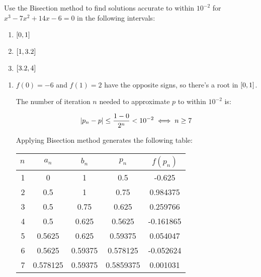 \documentclass[../../../../Assignments.tex]{subfiles}
\begin{document}
\begin{exercise}
    Use the Bisection method to find solutions accurate to within \(10^{-2}\)
    for \(x^3 - 7x^2 + 14x - 6 = 0\) in the following intervals:

    \begin{multicols}{3}
        \begin{enumerate}[label = (\alph*)]
            \item \(\interval{0}{1}\)
            \item \(\interval{1}{\num{3.2}}\)
            \item \(\interval{\num{3.2}}{4}\)
        \end{enumerate}
    \end{multicols}
\end{exercise}

\begin{solution}
    \begin{enumerate}[label = (\alph*)]
        \item \(f(0) = -6\) and \(f(1) = 2\) have the opposite signs, so there's
            a root in \(\interval{0}{1}\).

            The number of iteration \(n\) needed to approximate \(p\) to within
            \(10^{-2}\) is:

            \[\abs{p_n - p} \leq \frac{1 - 0}{2^n} < 10^{-2} \iff n \geq 7\]

            Applying Bisection method generates the following table:

            \begin{table}[H]
                \centering
                \begin{tabular}{r S[table-format=1.6] S[table-format=1.5] S[table-format=1.7] S[table-format=-1.6]}
                    \toprule
                    \(n\)  &  {\(a_n\)}  &  {\(b_n\)}  &  {\(p_n\)}  &  {\(f(p_n)\)}  \\
                      &  0          &  1          &  0.5        &  -0.625        \\
                        2  &  0.5        &  1          &  0.75       &   0.984375     \\
                        3  &  0.5        &  0.75       &  0.625      &   0.259766     \\
                        4  &  0.5        &  0.625      &  0.5625     &  -0.161865     \\
                        5  &  0.5625     &  0.625      &  0.59375    &   0.054047     \\
                        6  &  0.5625     &  0.59375    &  0.578125   &  -0.052624     \\
                        7  &  0.578125   &  0.59375    &  0.5859375  &   0.001031     \\
                    \bottomrule
                \end{tabular}
            \end{table}


\end{enumerate}
\end{solution}
\end{document}
